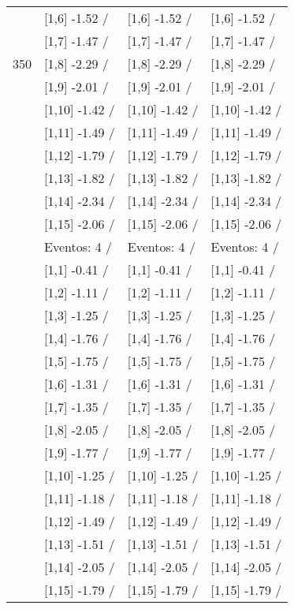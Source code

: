 \begin{table}
\begin{tabular}[t]{llll}
 & {}[1,6] -1.52  / & {}[1,6] -1.52  / & {}[1,6] -1.52  /\\
 & {}[1,7] -1.47  / & {}[1,7] -1.47  / & {}[1,7] -1.47  /\\
350 & {}[1,8] -2.29  / & {}[1,8] -2.29  / & {}[1,8] -2.29  /\\
\addlinespace
 & {}[1,9] -2.01  / & {}[1,9] -2.01  / & {}[1,9] -2.01  /\\
 & {}[1,10] -1.42  / & {}[1,10] -1.42  / & {}[1,10] -1.42  /\\
 & {}[1,11] -1.49  / & {}[1,11] -1.49  / & {}[1,11] -1.49  /\\
 & {}[1,12] -1.79  / & {}[1,12] -1.79  / & {}[1,12] -1.79  /\\
 & {}[1,13] -1.82  / & {}[1,13] -1.82  / & {}[1,13] -1.82  /\\
\addlinespace
 & {}[1,14] -2.34  / & {}[1,14] -2.34  / & {}[1,14] -2.34  /\\
 & {}[1,15] -2.06  / & {}[1,15] -2.06  / & {}[1,15] -2.06  /\\
 & Eventos:  4 / & Eventos:  4 / & Eventos:  4 /\\
 & {}[1,1] -0.41  / & {}[1,1] -0.41  / & {}[1,1] -0.41  /\\
 & {}[1,2] -1.11  / & {}[1,2] -1.11  / & {}[1,2] -1.11  /\\
\addlinespace
 & {}[1,3] -1.25  / & {}[1,3] -1.25  / & {}[1,3] -1.25  /\\
 & {}[1,4] -1.76  / & {}[1,4] -1.76  / & {}[1,4] -1.76  /\\
 & {}[1,5] -1.75  / & {}[1,5] -1.75  / & {}[1,5] -1.75  /\\
 & {}[1,6] -1.31  / & {}[1,6] -1.31  / & {}[1,6] -1.31  /\\
 & {}[1,7] -1.35  / & {}[1,7] -1.35  / & {}[1,7] -1.35  /\\
\addlinespace
500 & {}[1,8] -2.05  / & {}[1,8] -2.05  / & {}[1,8] -2.05  /\\
 & {}[1,9] -1.77  / & {}[1,9] -1.77  / & {}[1,9] -1.77  /\\
 & {}[1,10] -1.25  / & {}[1,10] -1.25  / & {}[1,10] -1.25  /\\
 & {}[1,11] -1.18  / & {}[1,11] -1.18  / & {}[1,11] -1.18  /\\
 & {}[1,12] -1.49  / & {}[1,12] -1.49  / & {}[1,12] -1.49  /\\
\addlinespace
 & {}[1,13] -1.51  / & {}[1,13] -1.51  / & {}[1,13] -1.51  /\\
 & {}[1,14] -2.05  / & {}[1,14] -2.05  / & {}[1,14] -2.05  /\\
 & {}[1,15] -1.79  / & {}[1,15] -1.79  / & {}[1,15] -1.79  /\\
\bottomrule
\end{tabular}
\end{table}
